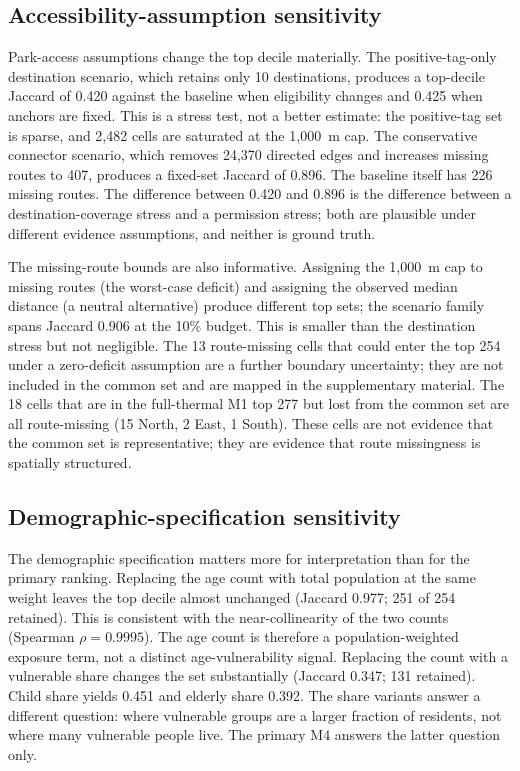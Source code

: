 \documentclass[times,twoside]{_Templates/MultiTargetManuscript}
\begin{document}



\subsection{Accessibility-assumption sensitivity}

Park-access assumptions change the top decile materially. The positive-tag-only
destination scenario, which retains only 10 destinations, produces a top-decile
Jaccard of 0.420 against the baseline when eligibility changes and 0.425 when
anchors are fixed. This is a stress test, not a better estimate: the positive-tag
set is sparse, and 2,482 cells are saturated at the 1,000~m cap. The conservative
connector scenario, which removes 24,370 directed edges and increases missing
routes to 407, produces a fixed-set Jaccard of 0.896. The baseline itself has 226
missing routes. The difference between 0.420 and 0.896 is the difference between
a destination-coverage stress and a permission stress; both are plausible under
different evidence assumptions, and neither is ground truth.

The missing-route bounds are also informative. Assigning the 1,000~m cap to
missing routes (the worst-case deficit) and assigning the observed median
distance (a neutral alternative) produce different top sets; the scenario family
spans Jaccard 0.906 at the 10\% budget. This is smaller than the destination
stress but not negligible. The 13 route-missing cells that could enter the top
254 under a zero-deficit assumption are a further boundary uncertainty; they are
not included in the common set and are mapped in the supplementary material.
The 18 cells that are in the full-thermal M1 top 277 but lost from the common set
are all route-missing (15 North, 2 East, 1 South). These cells are not evidence
that the common set is representative; they are evidence that route missingness
is spatially structured.

\subsection{Demographic-specification sensitivity}

The demographic specification matters more for interpretation than for the
primary ranking. Replacing the age count with total population at the same weight
leaves the top decile almost unchanged (Jaccard 0.977; 251 of 254 retained). This
is consistent with the near-collinearity of the two counts (Spearman
$\rho=0.9995$). The age count is therefore a population-weighted exposure term,
not a distinct age-vulnerability signal. Replacing the count with a vulnerable
share changes the set substantially (Jaccard 0.347; 131 retained). Child share
yields 0.451 and elderly share 0.392. The share variants answer a different
question: where vulnerable groups are a larger fraction of residents, not where
many vulnerable people live. The primary M4 answers the latter question only.
\end{document}

